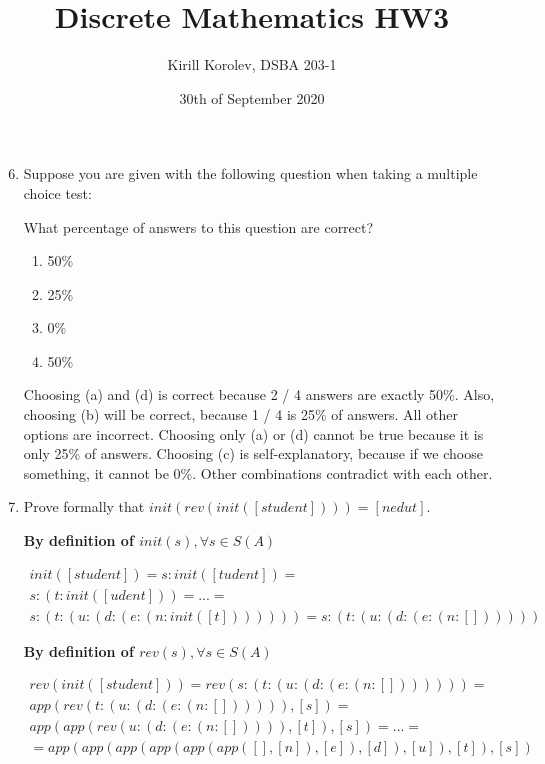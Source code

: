 \documentclass{article}
\title{Discrete Mathematics HW3}
\author{Kirill Korolev, DSBA 203-1}
\date{30th of September 2020}
\begin{document}
\maketitle

\begin{enumerate}
\setcounter{enumi}{5}

\item Suppose you are given with the following question when taking a multiple choice test:

What percentage of answers to this question are correct?

\begin{enumerate}
\item 50\%
\item 25\%
\item 0\%
\item 50\%
\end{enumerate}

Choosing (a) and (d) is correct because 2 / 4 answers are exactly 50\%. Also, choosing (b) will be correct, because 1 / 4 is 25\% of answers. All other options are incorrect. Choosing only (a) or (d) cannot be true because it is only 25\% of answers. Choosing (c) is self-explanatory, because if we choose something, it cannot be 0\%. Other combinations contradict with each other.

\item Prove formally that $init(rev(init([student]))) = [nedut]$.

\textbf{By definition of $init(s), \forall s \in S(A)$}

\begin{align*}
init([student]) = s : init([tudent]) =\\ s : (t : init([udent])) = ... =\\ s : (t : (u : (d : (e : (n : init([t])))))) = s : (t : (u : (d : (e : (n : [])))))
\end{align*}

\textbf{By definition of $rev(s), \forall s \in S(A)$}

\begin{align*}
rev(init([student])) = rev(s : (t : (u : (d : (e : (n : [])))))) =\\
app(rev(t : (u : (d : (e : (n : []))))), [s]) =\\ app(app(rev(u : (d : (e : (n : [])))), [t]), [s]) = ... = \\ = app(app(app(app(app(app([], [n]), [e]), [d]), [u]), [t]), [s]) 
\end{align*}


\end{enumerate}
\end{document}
